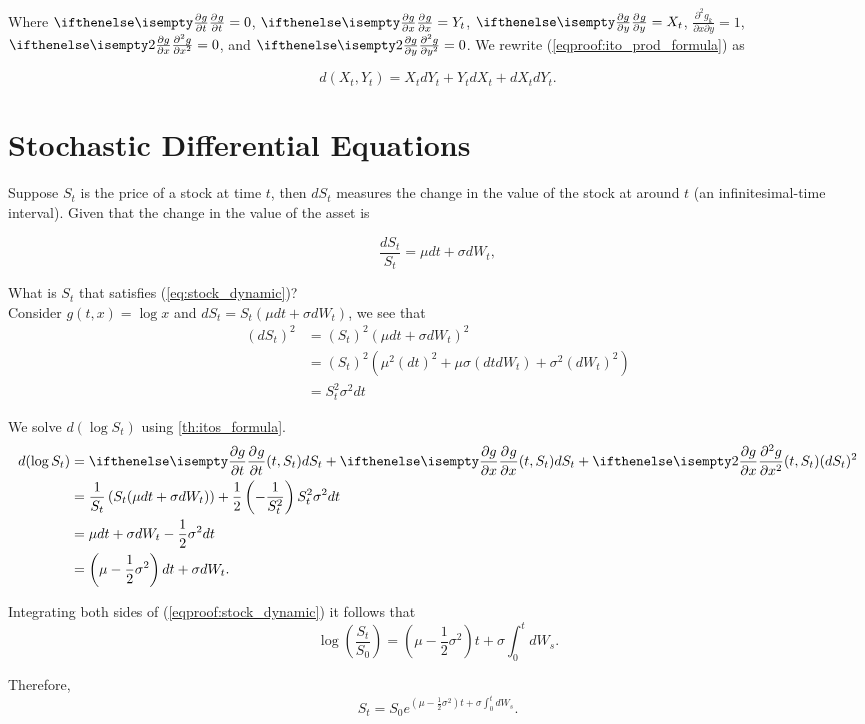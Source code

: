 \documentclass[../TGMAFFIRO.tex]{subfiles}
\begin{document}
Where $\partialwrt{g}{t} = 0$, $\partialwrt{g}{x} = Y_t$, $\partialwrt{g}{y} = X_t$, $\frac{\partial^2g_k}{\partial x\partial y} = 1$, $\partialwrt[2]{g}{x} = 0$, and $\partialwrt[2]{g}{y} = 0$. We rewrite (\ref{eqproof:ito_prod_formula}) as

\begin{equation}
  d(X_t, Y_t) = X_t dY_t + Y_t dX_t + dX_t dY_t. \label{eq:ito_rule_product}
\end{equation}

\section{Stochastic Differential Equations}
Suppose $S_t$ is the price of a stock at time $t$, then $dS_t$ measures the change in the value of the stock at around $t$ (an infinitesimal-time interval). Given that the change in the value of the asset is

\begin{equation}
	\frac{dS_t}{S_t} = \mu dt + \sigma dW_t, \label{eq:stock_dynamic}
\end{equation}

What is $S_t$ that satisfies (\ref{eq:stock_dynamic})?\\

Consider $g(t, x)= \log x$ and $dS_t = S_t(\mu dt + \sigma dW_t)$, we see that
\begin{align}
	\left(dS_t\right)^2 &= (S_t)^2(\mu dt + \sigma dW_t)^2\\
		&= (S_t)^2(\mu^2 \left(dt\right)^2 + \mu\sigma (dtdW_t) + \sigma^2 (dW_t)^2)\\
		&= S_t^2\sigma^2 dt
\end{align}

We solve $d(\log S_t)$ using \ref{th:itos_formula}.
\begin{align}
	d(\log S_t) &= \partialwrt{g}{t}{(t, S_t)} dS_t + \partialwrt{g}{x}{(t, S_t)} dS_t + \partialwrt[2]{g}{x}{(t, S_t)} (dS_t)^2 \nonumber \\
&= \frac{1}{S_t}\left(S_t(\mu dt + \sigma dW_t)\right) + \frac{1}{2}\left(-\frac{1}{S_t^2} \right)S_t^2\sigma^2 dt \nonumber \\
&= \mu dt + \sigma dW_t - \frac{1}{2}\sigma^2 dt \nonumber \\
&= \left(\mu - \frac{1}{2}\sigma^2\right)dt + \sigma dW_t. \label{eqproof:stock_dynamic}
\end{align}

Integrating both sides of (\ref{eqproof:stock_dynamic}) it follows that
\begin{equation}
	\log\left(\frac{S_t}{S_0}\right) = \left(\mu - \frac{1}{2}\sigma^2\right) t + \sigma\int_0^t dW_s.
\end{equation}

Therefore,
\begin{equation}
  S_t = S_0e^{\left(\mu - \frac{1}{2}\sigma^2\right) t + \sigma\int_0^t dW_s}.
\end{equation}
\end{document}
